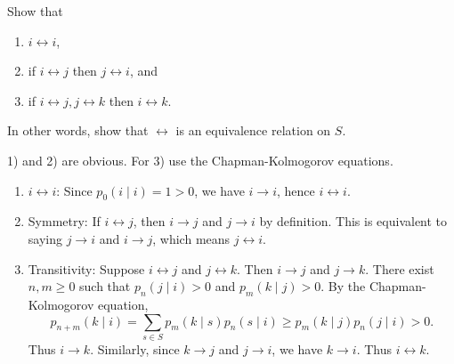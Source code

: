 \begin{Exercise}
\label{exr:equivalence-relation}
Show that

\begin{enumerate}
\item $i \leftrightarrow i$,
\item if $i \leftrightarrow j$ then $j \leftrightarrow i$, and
\item if $i \leftrightarrow j, j \leftrightarrow k$ then $i \leftrightarrow k$.
\end{enumerate}

In other words, show that $\leftrightarrow$ is an equivalence relation on $S$.

\begin{hint}
1) and 2) are obvious. For 3) use the Chapman-Kolmogorov equations.
\end{hint}
\end{Exercise}

\begin{Solution}
\begin{enumerate}
\item $i \leftrightarrow i$: Since $p_0(i \mid i) = 1 > 0$, we have $i \to i$, hence $i \leftrightarrow i$.
\item Symmetry: If $i \leftrightarrow j$, then $i \to j$ and $j \to i$ by definition. This is equivalent to saying $j \to i$ and $i \to j$, which means $j \leftrightarrow i$.
\item Transitivity: Suppose $i \leftrightarrow j$ and $j \leftrightarrow k$. Then $i \to j$ and $j \to k$. There exist $n, m \geq 0$ such that $p_n(j \mid i) > 0$ and $p_m(k \mid j) > 0$. By the Chapman-Kolmogorov equation,
\[
p_{n+m}(k \mid i) = \sum_{s \in S} p_m(k \mid s) p_n(s \mid i) \geq p_m(k \mid j) p_n(j \mid i) > 0.
\]
Thus $i \to k$. Similarly, since $k \to j$ and $j \to i$, we have $k \to i$. Thus $i \leftrightarrow k$.
\end{enumerate}
\end{Solution}

